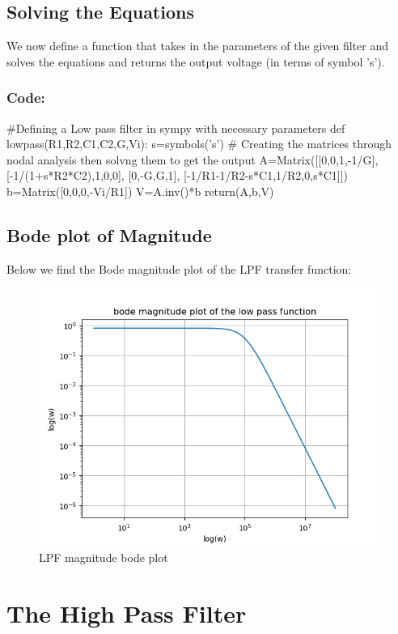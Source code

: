 \documentclass[11pt]{article}
\begin{document}
\subsection{Solving the Equations}
We now define a function that takes in the parameters of the given filter and solves the equations and returns the output voltage (in terms of symbol 's').

\subsubsection{Code:}
\begin{python}
#Defining a Low pass filter in sympy with necessary parameters
def lowpass(R1,R2,C1,C2,G,Vi):
	s=symbols('s')
	# Creating the matrices through nodal analysis then solvng them to get the output
	A=Matrix([[0,0,1,-1/G], [-1/(1+s*R2*C2),1,0,0], [0,-G,G,1], [-1/R1-1/R2-s*C1,1/R2,0,s*C1]])
	b=Matrix([0,0,0,-Vi/R1])
	V=A.inv()*b
	return(A,b,V)
\end{python}

\subsection{Bode plot of Magnitude}
Below we find the Bode magnitude plot of the LPF transfer function:

\begin{figure}[H]
    \centering
    \includegraphics[scale = 1]{Figure_1.png}
    \caption{LPF magnitude bode plot}
\end{figure}



\section{The High Pass Filter}
\end{document}
